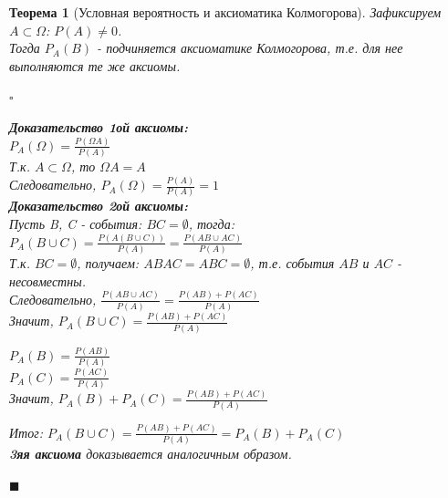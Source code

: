 \documentclass[14pt]{extarticle}
\theoremstyle{breakstyle}
\newtheorem{theorem}{Теорема}[subsection]
\begin{document}
\begin{theorem}[Условная вероятность и аксиоматика Колмогорова]

Зафиксируем $A \subset \Omega$: $P(A) \neq 0$. \\
Тогда $P_{A}(B)$ - подчиняется аксиоматике Колмогорова, т.е. для нее выполняются те же аксиомы.

$\square$

\textbf{Доказательство 1ой аксиомы:} \\
$P_{A}(\Omega) = \frac{P(\Omega A)}{P(A)}$ \\
Т.к. $A \subset \Omega$, то $\Omega A = A$ \\
Следовательно, $P_{A}(\Omega) = \frac{P(A)}{P(A)} = 1$ \\

\textbf{Доказательство 2ой аксиомы:} \\
Пусть B, C - события: $BC = \emptyset$, тогда: \\
$P_{A}(B \cup C) = \frac{P(A(B \cup C))}{P(A)} = \frac{P(AB \cup AC)}{P(A)}$ \\
Т.к. $BC = \emptyset$, получаем: $ABAC = ABC = \emptyset$, т.е. события $AB$ и $AC$ - несовместны. \\
Следовательно, $\frac{P(AB \cup AC)}{P(A)} = \frac{P(AB) + P(AC)}{P(A)}$ \\
Значит, $P_{A}(B \cup C) = \frac{P(AB) + P(AC)}{P(A)}$ \\

\vspace{1em}

$P_{A}(B) = \frac{P(AB)}{P(A)}$ \\
$P_{A}(C) = \frac{P(AC)}{P(A)}$ \\
Значит, $P_{A}(B) + P_{A}(C) = \frac{P(AB) + P(AC)}{P(A)}$ \\

\vspace{1em}

Итог: $P_{A}(B \cup C) = \frac{P(AB) + P(AC)}{P(A)} = P_{A}(B) + P_{A}(C)$ \\

\textbf{3яя аксиома} доказывается аналогичным образом.

\hfill$\blacksquare$

\end{theorem}
\end{document}
